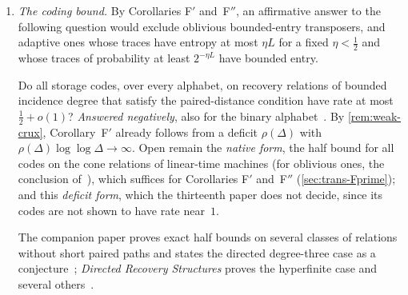 \begin{enumerate}[label=\arabic*.,leftmargin=2em]
\item \emph{The coding bound.} By Corollaries F$'$ and~F$''$, an affirmative answer to the following question would exclude oblivious
bounded-entry transposers, and adaptive ones whose traces have entropy at most $\eta L$ for a fixed $\eta<\frac12$ and whose
traces of probability at least $2^{-\eta L}$ have bounded entry.
\begin{problem}\label{prob:q91}
Do all storage codes, over every alphabet, on recovery relations of bounded incidence degree that satisfy the paired-distance
condition have rate at most $\frac12+o(1)$? \emph{Answered negatively}, also for the binary
alphabet~\cite[Theorem~A and Corollary~A$'$]{StorageCodes2026}. By \cref{rem:weak-crux}, Corollary~F$'$ already follows from a
deficit $\rho(\Delta)$ with $\rho(\Delta)\log\log\Delta\to\infty$. Open remain the \emph{native form}, the half bound for all
codes on the cone relations of linear-time machines (for oblivious ones, the conclusion
of~\cite[Proposition~9.2]{DirectedRecovery2026}), which suffices for Corollaries F$'$ and~F$''$ (\cref{sec:trans-Fprime}); and
this \emph{deficit form}, which the thirteenth paper does not decide, since its codes are not shown to have rate near~$1$.
\end{problem}
The companion paper proves exact half bounds on several classes of relations without short paired paths and states the
directed degree-three case as a conjecture~\cite{SeventhPaper2026}; \emph{Directed Recovery Structures} proves the hyperfinite
case and several others~\cite{DirectedRecovery2026}.


\end{enumerate}
